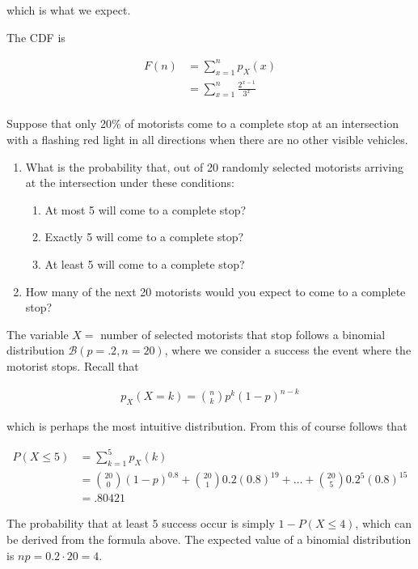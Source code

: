 \documentclass[a4paper, 12pt]{article}
\begin{document}
which is what we expect.

The CDF is 

\begin{align*}
    F(n) &= \sum_{x=1}^{n} p_X(x) \\  
    &= \sum_{x=1}^{n} \frac{2^{x-1}}{3^x} \\ 
\end{align*}

\pagebreak 

Suppose that only 20\% of motorists come to a complete stop at an intersection
with a flashing red light in all directions when there are no other visible
vehicles.

\begin{enumerate}
    \item What is the probability that, out of 20 randomly selected motorists arriving at the intersection under these conditions:
    \begin{enumerate}
        \item At most 5 will come to a complete stop?
        \item Exactly 5 will come to a complete stop?
        \item At least 5 will come to a complete stop?
    \end{enumerate}
    \item How many of the next 20 motorists would you expect to come to a complete stop?
\end{enumerate}

The variable $X =$ number of selected motorists that stop follows a binomial
distribution $\mathcal{B}(p = .2, n = 20)$, where we consider a success the
event where the motorist stops. Recall that 

\begin{align*}
    p_X(X = k) = \binom{n}{k}p^k(1-p)^{n - k}
\end{align*}

which is perhaps the most intuitive distribution. From this of course follows that 

\begin{align*}
    P(X \leq 5) &= \sum_{k=1}^{5} p_X(k) \\ 
                &=\binom{20}{0}(1-p)^{0.8} + \binom{20}{1}0.2(0.8)^{19} + \ldots + \binom{20}{5}0.2^5(0.8)^{15} \\ 
                &= .80421
\end{align*}

The probability that at least $5$ success occur is simply $1 - P(X \leq 4)$,
which can be derived from the formula above. The expected value of a binomial
distribution is $np = 0.2 \cdot 20 = 4$.
\end{document}
